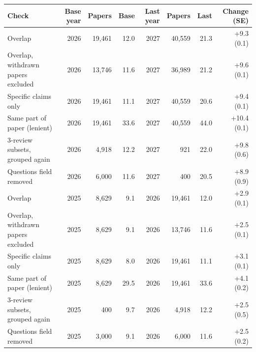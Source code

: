 \begin{tabular}{lrrrrrrr}
\toprule
Check & Base year & Papers & Base & Last year & Papers & Last & Change (SE) \\
\midrule
Overlap & 2026 & 19,461 & 12.0 & 2027 & 40,559 & 21.3 & +9.3 (0.1) \\
Overlap, withdrawn papers excluded & 2026 & 13,746 & 11.6 & 2027 & 36,989 & 21.2 & +9.6 (0.1) \\
Specific claims only & 2026 & 19,461 & 11.1 & 2027 & 40,559 & 20.6 & +9.4 (0.1) \\
Same part of paper (lenient) & 2026 & 19,461 & 33.6 & 2027 & 40,559 & 44.0 & +10.4 (0.1) \\
3-review subsets, grouped again & 2026 & 4,918 & 12.2 & 2027 & 921 & 22.0 & +9.8 (0.6) \\
Questions field removed & 2026 & 6,000 & 11.6 & 2027 & 400 & 20.5 & +8.9 (0.9) \\
\midrule
Overlap & 2025 & 8,629 & 9.1 & 2026 & 19,461 & 12.0 & +2.9 (0.1) \\
Overlap, withdrawn papers excluded & 2025 & 8,629 & 9.1 & 2026 & 13,746 & 11.6 & +2.5 (0.1) \\
Specific claims only & 2025 & 8,629 & 8.0 & 2026 & 19,461 & 11.1 & +3.1 (0.1) \\
Same part of paper (lenient) & 2025 & 8,629 & 29.5 & 2026 & 19,461 & 33.6 & +4.1 (0.2) \\
3-review subsets, grouped again & 2025 & 400 & 9.7 & 2026 & 4,918 & 12.2 & +2.5 (0.5) \\
Questions field removed & 2025 & 3,000 & 9.1 & 2026 & 6,000 & 11.6 & +2.5 (0.2) \\
\bottomrule
\end{tabular}

